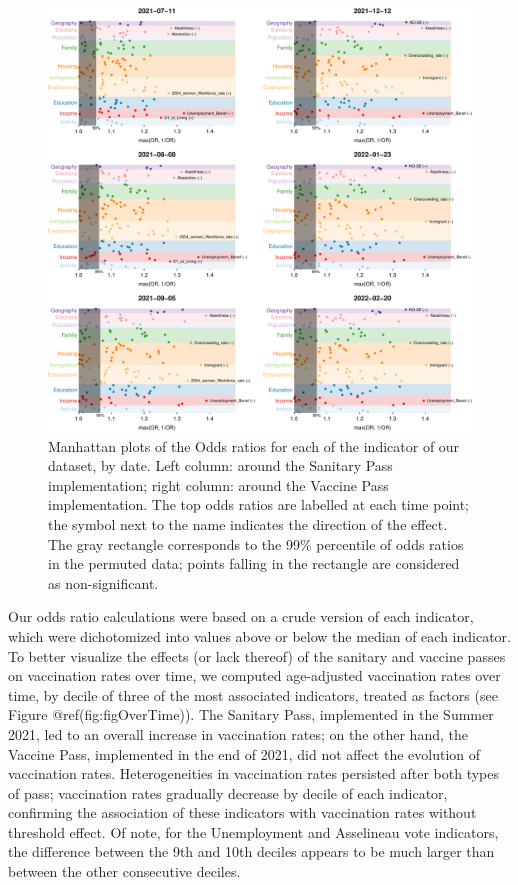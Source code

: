 \documentclass[
]{article}
\begin{document}
\begin{figure}
\centering
\includegraphics{ms_files/figure-latex/figManhattan-1.pdf}
\caption{Manhattan plots of the Odds ratios for each of the indicator of
our dataset, by date. Left column: around the Sanitary Pass
implementation; right column: around the Vaccine Pass implementation.
The top odds ratios are labelled at each time point; the symbol next to
the name indicates the direction of the effect. The gray rectangle
corresponds to the 99\% percentile of odds ratios in the permuted data;
points falling in the rectangle are considered as non-significant.}
\end{figure}

Our odds ratio calculations were based on a crude version of each
indicator, which were dichotomized into values above or below the median
of each indicator. To better visualize the effects (or lack thereof) of
the sanitary and vaccine passes on vaccination rates over time, we
computed age-adjusted vaccination rates over time, by decile of three of
the most associated indicators, treated as factors (see Figure
@ref(fig:figOverTime)). The Sanitary Pass, implemented in the Summer
2021, led to an overall increase in vaccination rates; on the other
hand, the Vaccine Pass, implemented in the end of 2021, did not affect
the evolution of vaccination rates. Heterogeneities in vaccination rates
persisted after both types of pass; vaccination rates gradually decrease
by decile of each indicator, confirming the association of these
indicators with vaccination rates without threshold effect. Of note, for
the Unemployment and Asselineau vote indicators, the difference between
the 9th and 10th deciles appears to be much larger than between the
other consecutive deciles.
\end{document}
